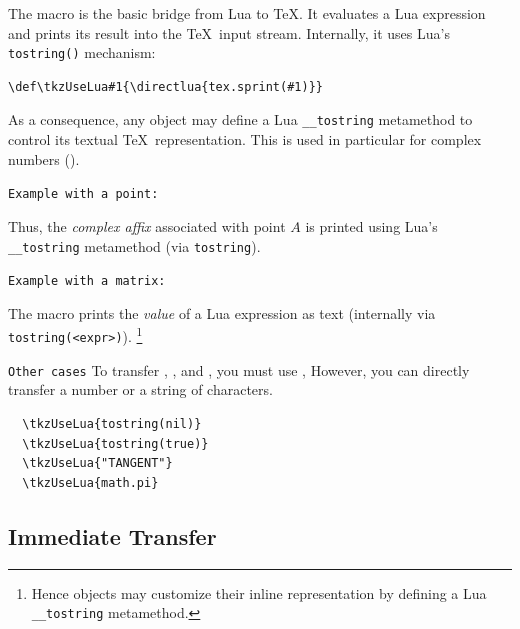 The macro  is the basic bridge from Lua to \TeX.
It evaluates a Lua expression and prints its result into the \TeX\ input stream.
Internally, it uses Lua's \texttt{tostring()} mechanism:

\begin{verbatim}
\def\tkzUseLua#1{\directlua{tex.sprint(#1)}}
\end{verbatim}

As a consequence, any  object may define a Lua
\texttt{\_\_tostring} metamethod to control its textual \TeX\ representation.
This is used in particular for complex numbers ().

\medskip
\texttt{Example with a point:}
\begin{tkzexample}[latex=.5\textwidth]
\end{tkzexample}

Thus, the \emph{complex affix} associated with point $A$ is printed using
Lua’s \texttt{\_\_tostring} metamethod (via \texttt{tostring}).

\medskip
\texttt{Example with a matrix: }

The macro  prints the \emph{value} of a Lua expression
as text (internally via \texttt{tostring(<expr>)}).%
\footnote{Hence objects may customize their inline representation by defining a Lua \texttt{\_\_tostring} metamethod.}


\medskip
\begin{tkzexample}[latex=.5\textwidth]
\end{tkzexample}

\texttt{Other cases}
To transfer , , and , you must use , However, you can directly transfer a number or a string of characters.

\begin{verbatim}
  \tkzUseLua{tostring(nil)}
  \tkzUseLua{tostring(true)}
  \tkzUseLua{"TANGENT"}
  \tkzUseLua{math.pi}
\end{verbatim}
\subsection{Immediate Transfer}
\label{subsec:transfer_immediate}

